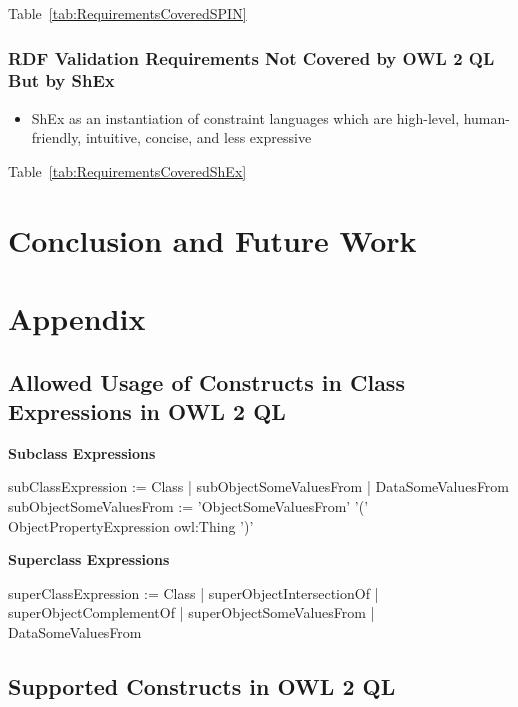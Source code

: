 \documentclass{llncs}
\begin{document}
Table~\ref{tab:RequirementsCoveredSPIN}

\subsubsection{RDF Validation Requirements Not Covered by OWL 2 QL But by ShEx}

\begin{itemize}
	\item ShEx as an instantiation of constraint languages which are high-level, human-friendly, intuitive, concise, and less expressive 
\end{itemize}

Table~\ref{tab:RequirementsCoveredShEx}

\section{Conclusion and Future Work}

\section{Appendix}


\subsection{Allowed Usage of Constructs in Class Expressions in OWL 2 QL}

\textbf{Subclass Expressions}

\begin{ex}
subClassExpression :=
    Class |
    subObjectSomeValuesFrom | DataSomeValuesFrom
subObjectSomeValuesFrom := 'ObjectSomeValuesFrom' '(' ObjectPropertyExpression owl:Thing ')'
\end{ex}

\textbf{Superclass Expressions}

\begin{ex}
superClassExpression :=
    Class |
    superObjectIntersectionOf | superObjectComplementOf |
    superObjectSomeValuesFrom | DataSomeValuesFrom
\end{ex}
 
\subsection{Supported Constructs in OWL 2 QL}
\end{document}
